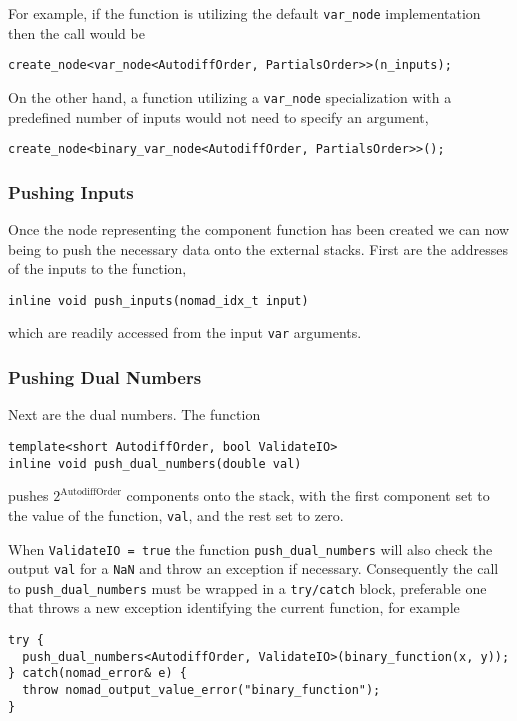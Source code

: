 For example, if the function is utilizing the default \verb|var_node|
implementation then the call would be
%
\begin{verbatim}
create_node<var_node<AutodiffOrder, PartialsOrder>>(n_inputs);
\end{verbatim}
%
On the other hand, a function utilizing a \verb|var_node| specialization
with a predefined number of inputs would not need to specify an
argument,
%
\begin{verbatim}
create_node<binary_var_node<AutodiffOrder, PartialsOrder>>();
\end{verbatim}

\subsubsection{Pushing Inputs}

Once the node representing the component function has been created
we can now being to push the necessary data onto the external stacks.
First are the addresses of the inputs to the function,
%
\begin{verbatim}
inline void push_inputs(nomad_idx_t input)
\end{verbatim}
%
which are readily accessed from the input \verb|var| arguments.

\subsubsection{Pushing Dual Numbers}

Next are the dual numbers.  The function
%
\begin{verbatim}
template<short AutodiffOrder, bool ValidateIO>
inline void push_dual_numbers(double val)
\end{verbatim}
%
pushes $2^{\mathrm{AutodiffOrder}}$ components onto the stack, with
the first component set to the value of the function, \verb|val|, and the
rest set to zero.

When \verb|ValidateIO = true| the function \verb|push_dual_numbers|
will also check the output \verb|val| for a \verb|NaN| and throw an
exception if necessary.  Consequently the call to \verb|push_dual_numbers|
must be wrapped in a \verb|try/catch| block, preferable one that throws
a new exception identifying the current function, for example
%
\begin{verbatim}
try {
  push_dual_numbers<AutodiffOrder, ValidateIO>(binary_function(x, y));
} catch(nomad_error& e) {
  throw nomad_output_value_error("binary_function");
}
\end{verbatim}

